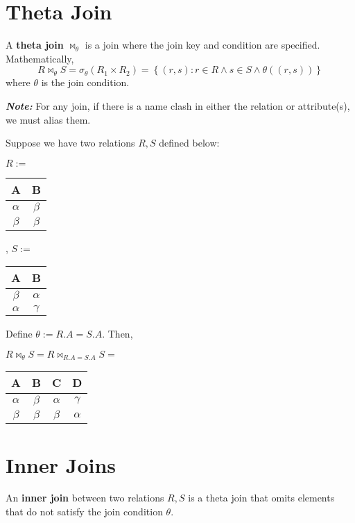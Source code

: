 \documentclass{report}
\newenvironment{definition}[1]{\begin{tcolorbox}[title={Definition: #1}]}{\end{tcolorbox}}
\newenvironment{example}{\begin{tcolorbox}[title={Example},colback=green!5!white,colframe=black!75!green]}{\end{tcolorbox}}
\renewcommand{\bf}[1]{\textbf{{#1}}}
\newcommand{\ib}[1]{\textit{\textbf{{#1}}}}
\begin{document}
\section{Theta Join}
\begin{definition}{Theta Join}
    A \bf{theta join} $\bowtie_{\theta}$ is a join where the join key and condition are specified.
    Mathematically,
    \[
        R \bowtie_{\theta} S 
        = \sigma_{\theta} (R_1 \times R_2)
        = \left\{ (r, s) : r \in R \land s \in S \land \theta((r, s)) \right\}
    \]
    where $\theta$ is the join condition.
\end{definition}
\ib{Note:} For any join, if there is a name clash in either the relation or attribute(s), we must
alias them.
\begin{example}
    Suppose we have two relations $R, S$ defined below:
    \begin{center}
        $R :=$
        \begin{tabular}{c|c}
            A & B \\
            \hline
            $\alpha$ & $\beta$ \\
            $\beta$ & $\beta$
        \end{tabular}
        , $S :=$
        \begin{tabular}{c|c}
            A & B \\
            \hline
            $\beta$ & $\alpha$ \\
            $\alpha$ & $\gamma$
        \end{tabular}
    \end{center}
    Define $\theta := R.A = S.A$. Then,
    \begin{center}
        $R \bowtie_{\theta} S = R \bowtie_{R.A = S.A} S =$
        \begin{tabular}{c|c|c|c}
            A & B & C & D \\
            \hline
            $\alpha$ & $\beta$ & $\alpha$ & $\gamma$ \\
            $\beta$ & $\beta$ & $\beta$ & $\alpha$ \\
        \end{tabular}
    \end{center}
\end{example}


\section{Inner Joins}
\begin{definition}{Theta Join}
    An \bf{inner join} between two relations $R, S$ is a theta join that omits elements that do not
    satisfy the join condition $\theta$.
\end{definition}
\end{document}
